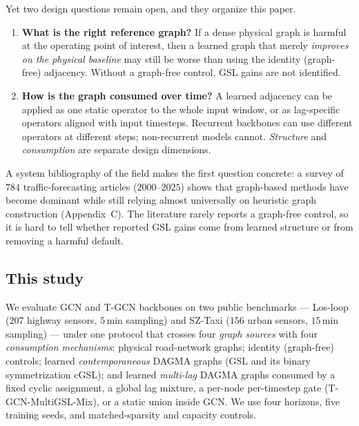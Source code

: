 Yet two design questions remain open, and they organize this paper.

\begin{enumerate}
\item \textbf{What is the right reference graph?} If a dense physical graph
is harmful at the operating point of interest, then a learned graph that
merely \emph{improves on the physical baseline} may still be worse than
using the identity (graph-free) adjacency. Without a graph-free control,
GSL gains are not identified.
\item \textbf{How is the graph consumed over time?} A learned adjacency can
be applied as one static operator to the whole input window, or as
lag-specific operators aligned with input timesteps. Recurrent backbones
can use different operators at different steps; non-recurrent models
cannot. \emph{Structure} and \emph{consumption} are separate design
dimensions.
\end{enumerate}

A system bibliography of the field makes the first question concrete: a
survey of $784$ traffic-forecasting articles ($2000$--$2025$) shows that
graph-based methods have become dominant while still relying almost
universally on heuristic graph construction (Appendix~C). The literature
rarely reports a graph-free control, so it is hard to tell whether reported
GSL gains come from learned structure or from removing a harmful default.

\subsection*{This study}

We evaluate GCN and T-GCN backbones on two public benchmarks --- Los-loop
($207$ highway sensors, $5$\,min sampling) and SZ-Taxi ($156$ urban
sensors, $15$\,min sampling) --- under one protocol that crosses four
\emph{graph sources} with four \emph{consumption mechanisms}:
physical road-network graphs; identity (graph-free) controls; learned
\emph{contemporaneous} DAGMA graphs (GSL and its binary symmetrization
cGSL); and learned \emph{multi-lag} DAGMA graphs consumed by a fixed cyclic
assignment, a global lag mixture, a per-node per-timestep gate
(T-GCN-MultiGSL-Mix), or a static union inside GCN. We use four horizons,
five training seeds, and matched-sparsity and capacity controls.

